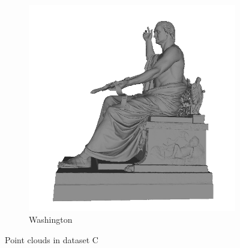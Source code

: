 \begin{figure}
\begin{subfigure}[b]{0.23\linewidth}
	\includegraphics[width=\linewidth]{./Figures/test-dataset/04.washington.png}
	\caption{Washington}
\end{subfigure}
	
	\label{fig:dataset_c}
	\caption{Point clouds in dataset C}
\end{figure}
